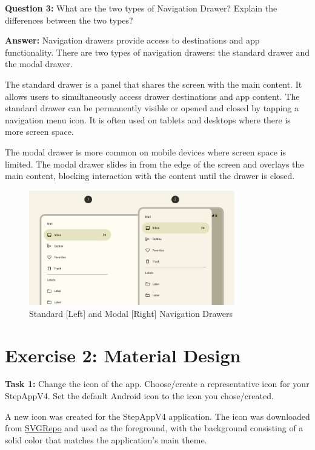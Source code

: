 \documentclass{usireport}
\begin{document}
\textbf{Question 3:} What are the two types of Navigation Drawer? Explain the differences between the two types?

\textbf{Answer:} Navigation drawers provide access to destinations and app functionality. There are two types of navigation drawers: the standard drawer and the modal drawer.

The standard drawer is a panel that shares the screen with the main content. It allows users to simultaneously access drawer destinations and app content. The standard drawer can be permanently visible or opened and closed by tapping a navigation menu icon. It is often used on tablets and desktops where there is more screen space.

The modal drawer is more common on mobile devices where screen space is limited. The modal drawer slides in from the edge of the screen and overlays the main content, blocking interaction with the content until the drawer is closed.

\begin{figure}[H]
    \centering
    \includegraphics[trim={0 10cm 0 5cm},clip,width=0.8\textwidth]{fig/drawers.png}
    \caption{Standard [Left] and Modal [Right] Navigation Drawers}
    \label{fig:nav_drawer}
\end{figure}


\section{Exercise 2: Material Design}

\textbf{Task 1:} Change the icon of the app. Choose/create a representative icon for your StepAppV4. Set the default Android icon to the icon you chose/created.

A new icon was created for the StepAppV4 application. The icon was downloaded from \href{https://www.svgrepo.com/svg/35735/feet-footprint}{SVGRepo} and used as the foreground, with the background consisting of a solid color that matches the application's main theme.
\end{document}
